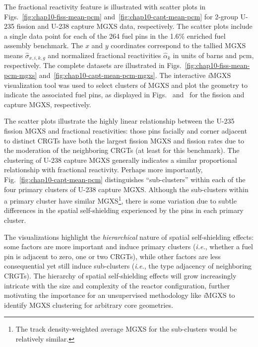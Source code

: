 The fractional reactivity feature is illustrated with scatter plots in Figs.~\ref{fig:chap10-fiss-mean-pcm} and~\ref{fig:chap10-capt-mean-pcm} for 2-group U-235 fission and U-238 capture \ac{MGXS} data, respectively. The scatter plots include a single data point for each of the 264 fuel pins in the 1.6\% enriched fuel assembly benchmark. The $x$ and $y$ coordinates correspond to the tallied \ac{MGXS} means $\hat{\sigma}_{x,i,k,g}$ and normalized fractional reactivities $\hat{\alpha}_{k}$ in units of barns and \ac{pcm}, respectively. The complete datasets are illustrated in Figs.~\ref{fig:chap10-fiss-mean-pcm-mgxs} and~\ref{fig:chap10-capt-mean-pcm-mgxs}. The interactive \textit{i}\ac{MGXS} visualization tool was used to select clusters of \ac{MGXS} and plot the geometry to indicate the associated fuel pins, as displayed in Figs.~ and~ for the fission and capture \ac{MGXS}, respectively. 

The scatter plots illustrate the highly linear relationship between the U-235 fission \ac{MGXS} and fractional reactivities: those pins facially and corner adjacent to distinct \acp{CRGT} have both the largest fission \ac{MGXS} and fission rates due to the moderation of the neighboring \acp{CRGT} (at least for this benchmark). The clustering of U-238 capture \ac{MGXS} generally indicates a similar proportional relationship with fractional reactivity. Perhaps more importantly, Fig.~\ref{fig:chap10-capt-mean-pcm} distinguishes ``sub-clusters'' within each of the four primary clusters of U-238 capture \ac{MGXS}. Although the sub-clusters within a primary cluster have similar \ac{MGXS}\footnote{The track density-weighted average \ac{MGXS} for the sub-clusters would be relatively similar.}, there is some variation due to subtle differences in the spatial self-shielding experienced by the pins in each primary cluster.

The visualizations highlight the \textit{hierarchical} nature of spatial self-shielding effects: some factors are more important and induce primary clusters (\textit{i.e.}, whether a fuel pin is adjacent to zero, one or two \acp{CRGT}), while other factors are less consequential yet still induce sub-clusters (\textit{i.e.}, the type adjacency of neighboring \acp{CRGT}). The hierarchy of spatial self-shielding effects will grow increasingly intricate with the size and complexity of the reactor configuration, further motivating the importance for an unsupervised methodology like \textit{i}\ac{MGXS} to identify \ac{MGXS} clustering for arbitrary core geometries.

